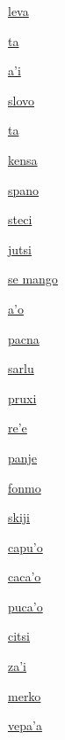 {\hyperlink{val:leva}{leva}}{}{}{}

{\hyperlink{val:ta}{ta}}{}{}{}

{\hyperlink{val:ahi}{a'i}}{}{}{}

{\hyperlink{val:slovo}{slovo}}{}{}{}

{\hyperlink{val:ta}{ta}}{}{}{}

{\hyperlink{val:kensa}{kensa}}{}{}{}

{\hyperlink{val:spano}{spano}}{}{}{}

{\hyperlink{val:steci}{steci}}{}{}{}

{\hyperlink{val:jutsi}{jutsi}}{}{}{}

{\hyperlink{val:mango}{se mango}}{}{}{}

{\hyperlink{val:aho}{a'o}}{}{}{}

{\hyperlink{val:pacna}{pacna}}{}{}{}

{\hyperlink{val:sarlu}{sarlu}}{}{}{}

{\hyperlink{val:pruxi}{pruxi}}{}{}{}

{\hyperlink{val:rehe}{re'e}}{}{}{}

{\hyperlink{val:panje}{panje}}{}{}{}

{\hyperlink{val:fonmo}{fonmo}}{}{}{}

{\hyperlink{val:skiji}{skiji}}{}{}{}

{\hyperlink{val:capuho}{capu'o}}{}{}{}

{\hyperlink{val:cacaho}{caca'o}}{}{}{}

{\hyperlink{val:pucaho}{puca'o}}{}{}{}

{\hyperlink{val:citsi}{citsi}}{}{}{}

{\hyperlink{val:zahi}{za'i}}{}{}{}

{\hyperlink{val:merko}{merko}}{}{}{}

{\hyperlink{val:vepaha}{vepa'a}}{}{}{}

